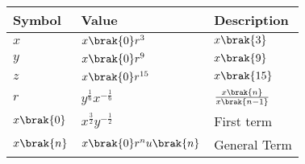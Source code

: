 \begin{tabular}{|m{2cm}|m{2cm}|m{2cm}|}
    \hline
    \textbf{Symbol} & \textbf{Value} & \textbf{Description}\\ [1ex]
    \hline
        $x$ & $x\brak{0}r^3$ & $x\brak{3}$ \\ [1ex]
    \hline
        $y$ & $x\brak{0}r^{9}$ & $x\brak{9}$\\ [1ex]
    \hline
        $z$ & $x\brak{0}r^{15}$ & $x\brak{15}$\\ [1ex]
    \hline
        $r$ & $y^{\frac{1}{6}}x^{-\frac{1}{6}}$ & $\frac{x\brak{n}}{x\brak{n-1}}$\\[1ex]
    \hline \vspace{0.1cm}
        $x\brak{0}$ & $x^{\frac{3}{2}}y^{-\frac{1}{2}}$ & First term \\[1ex]
    \hline
        $x\brak{n}$ & $x\brak{0}r^nu\brak{n}$ & General Term \\ [1ex]
    \hline
    \end{tabular}
